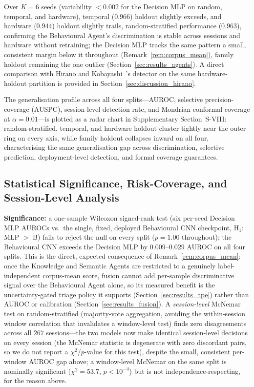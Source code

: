 \documentclass[journal]{IEEEtran}
\begin{document}
Over $K{=}6$ seeds (variability ${<}0.002$ for the Decision MLP on
random, temporal, and hardware), temporal ($0.966$) holdout slightly
exceeds, and hardware ($0.944$) holdout slightly trails, random-stratified
performance ($0.963$), confirming the Behavioural Agent's discrimination
is stable across sessions and hardware without retraining; the Decision
MLP tracks the same pattern a small, consistent margin below it
throughout (Remark~\ref{rem:corpus_mean}), family holdout remaining the
one outlier (Section~\ref{sec:results_agents}). A direct comparison with
Hirano and Kobayashi~\cite{hirano2025ransmap}'s detector on the same
hardware-holdout partition is provided in Section~\ref{sec:discussion_hirano}.

The generalisation profile across all four splits---AUROC, selective
precision-coverage (AUSPC), session-level detection rate, and Mondrian
conformal coverage at $\alpha{=}0.01$---is plotted as a radar chart in
Supplementary Section~S-VIII: random-stratified, temporal, and hardware
holdout cluster tightly near the outer ring on every axis, while family
holdout collapses inward on all four, characterising the same
generalisation gap across discrimination, selective prediction,
deployment-level detection, and formal coverage guarantees.

\subsection{Statistical Significance, Risk-Coverage, and Session-Level Analysis}\label{sec:results_significance}

\textbf{Significance:} a one-sample Wilcoxon signed-rank test (six per-seed
Decision MLP AUROCs vs.\ the single, fixed, deployed Behavioural CNN
checkpoint, H$_1$: MLP $>$ B) fails to reject the null on every split
($p{=}1.00$ throughout); the Behavioural CNN exceeds the Decision MLP by
$0.009$--$0.029$ AUROC on all four splits. This is the direct, expected
consequence of Remark~\ref{rem:corpus_mean}: once the Knowledge and
Semantic Agents are restricted to a genuinely label-independent corpus-mean
score, fusion cannot add per-sample discriminative signal over the
Behavioural Agent alone, so its measured benefit is the uncertainty-gated
triage policy it supports (Section~\ref{sec:results_tpe}) rather than
AUROC or calibration (Section~\ref{sec:results_fusion}). A \emph{session-level}
McNemar test on random-stratified (majority-vote aggregation, avoiding the
within-session window correlation that invalidates a window-level test)
finds zero disagreements across all $267$ sessions---the two models now
make identical session-level decisions on every session (the McNemar
statistic is degenerate with zero discordant pairs, so we do not report a
$\chi^2$/$p$-value for this test), despite the small, consistent
per-window AUROC gap above; a window-level McNemar on the same split is
nominally significant ($\chi^2{=}53.7$, $p{<}10^{-4}$) but is not
independence-respecting, for the reason above.
\end{document}
